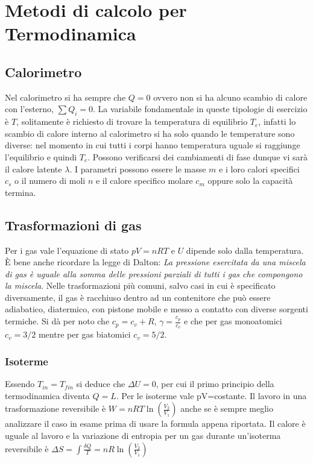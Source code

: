 \documentclass{article}
\begin{document}
\section*{Metodi di calcolo per Termodinamica}
\subsection*{Calorimetro}
Nel calorimetro si ha sempre che $Q=0$ ovvero non si ha alcuno scambio di calore con l'esterno, $\sum Q_i=0$. La variabile fondamentale in queste tipologie di esercizio è $T$, solitamente è richiesto di trovare la temperatura di equilibrio $T_e$, infatti lo scambio di calore interno al calorimetro si ha solo quando le temperature sono diverse: nel momento in cui tutti i corpi hanno temperatura uguale si raggiunge l'equilibrio e quindi $T_e$. Possono verificarsi dei cambiamenti di fase dunque vi sarà il calore latente $\lambda$. I parametri possono essere le masse $m$ e i loro calori specifici $c_s$ o il numero di moli $n$ e il calore specifico molare $c_m$ oppure solo la capacità termina. 

\subsection*{Trasformazioni di gas}
Per i gas vale l'equazione di stato $pV=nRT$ e $U$ dipende solo dalla temperatura. È bene anche ricordare la legge di Dalton: \textit{La pressione esercitata da una miscela di gas è uguale alla somma delle pressioni parziali di tutti i gas che compongono la miscela}. Nelle trasformazioni più comuni, salvo casi in cui è specificato diversamente, il gas è racchiuso dentro ad un contenitore che può essere adiabatico, diatermico, con pistone mobile e messo a contatto con diverse sorgenti termiche. Si dà per noto che $c_p=c_v+R$, $\gamma=\frac{c_p}{c_v}$ e che per gas monoatomici $c_v=3/2$ mentre per gas biatomici $c_v=5/2$.
\subsubsection*{Isoterme}
Essendo $T_{in}=T_{fin}$ si deduce che $\Delta U=0$, per cui il primo principio della termodinamica diventa $Q=L$. Per le isoterme vale pV=costante. Il lavoro in una trasformazione reversibile è $W=nRT\ln(\frac{V_2}{V_1})$ anche se è sempre meglio analizzare il caso in esame prima di usare la formula appena riportata. Il calore è uguale al lavoro e la variazione di entropia per un gas durante un'isoterma reversibile è $\Delta S=\int \frac{\delta Q}{T}=nR\ln({\frac{V_2}{V_1}})$
\end{document}
